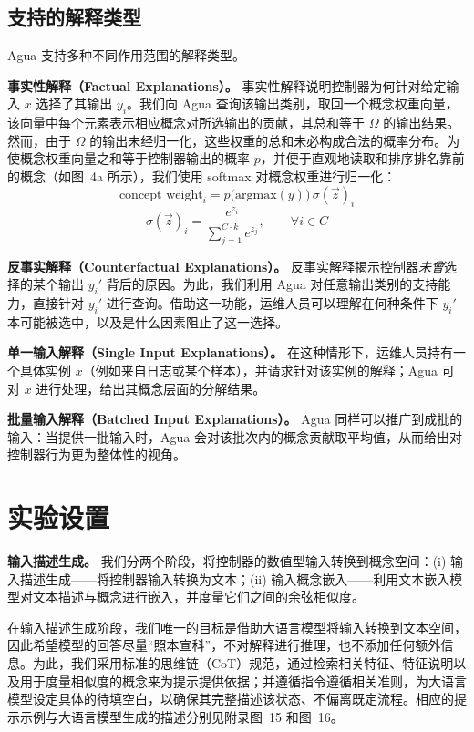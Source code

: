 \documentclass[11pt,a4paper]{article}
\begin{document}
\subsection{支持的解释类型}

Agua 支持多种不同作用范围的解释类型。

\textbf{事实性解释（Factual Explanations）。} 事实性解释说明控制器为何针对给定输入 $x$ 选择了其输出 $y_i$。我们向 Agua 查询该输出类别，取回一个概念权重向量，该向量中每个元素表示相应概念对所选输出的贡献，其总和等于 $\Omega$ 的输出结果。然而，由于 $\Omega$ 的输出未经归一化，这些权重的总和未必构成合法的概率分布。为使概念权重向量之和等于控制器输出的概率 $p$，并便于直观地读取和排序排名靠前的概念（如图~4a 所示），我们使用 softmax 对概念权重进行归一化：
\begin{equation}
\text{concept weight}_i = p\big(\text{argmax}(y)\big)\,\sigma(\vec{z})_i
\label{eq:factual1}
\end{equation}
\begin{equation}
\sigma(\vec{z})_i = \frac{e^{z_i}}{\sum_{j=1}^{C\cdot k} e^{z_j}}, \qquad \forall i\in C
\label{eq:factual2}
\end{equation}

\textbf{反事实解释（Counterfactual Explanations）。} 反事实解释揭示控制器\emph{未曾}选择的某个输出 $y_i'$ 背后的原因。为此，我们利用 Agua 对任意输出类别的支持能力，直接针对 $y_i'$ 进行查询。借助这一功能，运维人员可以理解在何种条件下 $y_i'$ 本可能被选中，以及是什么因素阻止了这一选择。

\textbf{单一输入解释（Single Input Explanations）。} 在这种情形下，运维人员持有一个具体实例 $x$（例如来自日志或某个样本），并请求针对该实例的解释；Agua 可对 $x$ 进行处理，给出其概念层面的分解结果。

\textbf{批量输入解释（Batched Input Explanations）。} Agua 同样可以推广到成批的输入：当提供一批输入时，Agua 会对该批次内的概念贡献取平均值，从而给出对控制器行为更为整体性的视角。

\section{实验设置}

\textbf{输入描述生成。} 我们分两个阶段，将控制器的数值型输入转换到概念空间：(i) 输入描述生成——将控制器输入转换为文本；(ii) 输入概念嵌入——利用文本嵌入模型对文本描述与概念进行嵌入，并度量它们之间的余弦相似度。

在输入描述生成阶段，我们唯一的目标是借助大语言模型将输入转换到文本空间，因此希望模型的回答尽量“照本宣科”，不对解释进行推理，也不添加任何额外信息。为此，我们采用标准的思维链（CoT）规范，通过检索相关特征、特征说明以及用于度量相似度的概念来为提示提供依据；并遵循指令遵循相关准则，为大语言模型设定具体的待填空白，以确保其完整描述该状态、不偏离既定流程。相应的提示示例与大语言模型生成的描述分别见附录图~15 和图~16。
\end{document}
